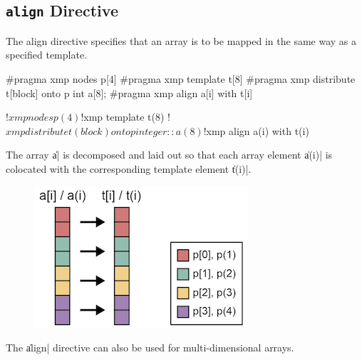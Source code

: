 \subsection{{\tt align} Directive}


The align directive specifies that an array is to be mapped in the same
way as a specified template.


\begin{XCexample}
#pragma xmp nodes p[4]
#pragma xmp template t[8]
#pragma xmp distribute t[block] onto p
int a[8];
#pragma xmp align a[i] with t[i]
\end{XCexample}

\begin{XFexample}
!$xmp nodes p(4)
!$xmp template t(8)
!$xmp distribute t(block) onto p
integer :: a(8)
!$xmp align a(i) with t(i)
\end{XFexample}

The array \|a| is decomposed and laid out so that each array element
\|a(i)| is colocated with the corresponding template element \|t(i)|.


\begin{figure}
  \centering
  \includegraphics{figs/1dim.png}
\end{figure}

The \|align| directive can also be used for multi-dimensional arrays.

